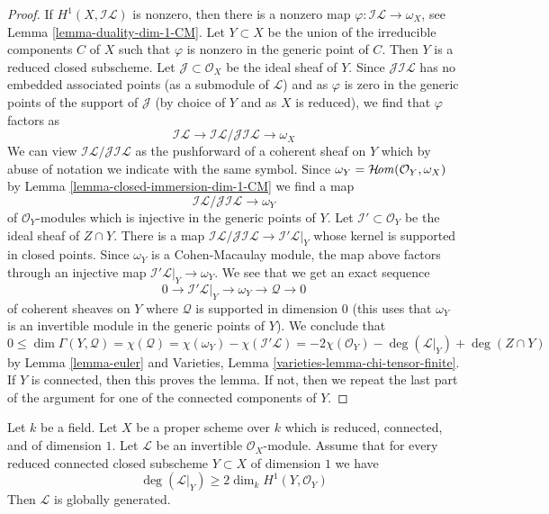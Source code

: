 \begin{proof}
If $H^1(X, \mathcal{I}\mathcal{L})$ is nonzero, then there is a nonzero map
$\varphi : \mathcal{I}\mathcal{L} \to \omega_X$, see
Lemma \ref{lemma-duality-dim-1-CM}. Let $Y \subset X$
be the union of the irreducible components $C$ of $X$ such that
$\varphi$ is nonzero in the generic point of $C$.
Then $Y$ is a reduced closed subscheme.
Let $\mathcal{J} \subset \mathcal{O}_X$ be the ideal sheaf of $Y$.
Since $\mathcal{J}\mathcal{I}\mathcal{L}$
has no embedded associated points
(as a submodule of $\mathcal{L}$) and as $\varphi$ is zero
in the generic points of the support of $\mathcal{J}$
(by choice of $Y$ and as $X$ is reduced), we find that
$\varphi$ factors as
$$
\mathcal{I}\mathcal{L} \to
\mathcal{I}\mathcal{L}/\mathcal{J}\mathcal{I}\mathcal{L} \to \omega_X
$$
We can view $\mathcal{I}\mathcal{L}/\mathcal{J}\mathcal{I}\mathcal{L}$
as the pushforward of a coherent sheaf on $Y$ which by abuse of
notation we indicate with the same symbol.
Since $\omega_Y = \mathop{\mathcal{H}\!\mathit{om}}\nolimits(\mathcal{O}_Y, \omega_X)$
by Lemma \ref{lemma-closed-immersion-dim-1-CM}
we find a map
$$
\mathcal{I}\mathcal{L}/
\mathcal{J}\mathcal{I}\mathcal{L} 
\to \omega_Y
$$
of $\mathcal{O}_Y$-modules which is injective in the generic points
of $Y$. Let $\mathcal{I}' \subset \mathcal{O}_Y$ be the ideal
sheaf of $Z \cap Y$. There is a map
$\mathcal{I}\mathcal{L}/\mathcal{J}\mathcal{I}\mathcal{L} \to
\mathcal{I}'\mathcal{L}|_Y$ whose kernel is supported in closed points.
Since $\omega_Y$ is a Cohen-Macaulay module, the map above
factors through an injective map $\mathcal{I}'\mathcal{L}|_Y \to
\omega_Y$. We see that we get
an exact sequence
$$
0 \to \mathcal{I}'\mathcal{L}|_Y \to \omega_Y \to \mathcal{Q} \to 0
$$
of coherent sheaves on $Y$ where $\mathcal{Q}$ is supported in dimension $0$
(this uses that $\omega_Y$ is an invertible module in the generic points
of $Y$). We conclude that
$$
0 \leq \dim \Gamma(Y, \mathcal{Q}) =
\chi(\mathcal{Q}) = \chi(\omega_Y) - \chi(\mathcal{I}'\mathcal{L}) =
-2\chi(\mathcal{O}_Y) - \deg(\mathcal{L}|_Y) + \deg(Z \cap Y)
$$
by Lemma \ref{lemma-euler} and
Varieties, Lemma \ref{varieties-lemma-chi-tensor-finite}.
If $Y$ is connected, then this proves the lemma.
If not, then we repeat the last part of the argument
for one of the connected components of $Y$.
\end{proof}

\begin{lemma}
\label{lemma-global-generation}
Let $k$ be a field. Let $X$ be a proper scheme over $k$
which is reduced, connected, and of dimension $1$.
Let $\mathcal{L}$ be an invertible $\mathcal{O}_X$-module.
Assume that for every reduced connected closed subscheme
$Y \subset X$ of dimension $1$ we have
$$
\deg(\mathcal{L}|_Y) \geq 2\dim_k H^1(Y, \mathcal{O}_Y)
$$
Then $\mathcal{L}$ is globally generated.
\end{lemma}

